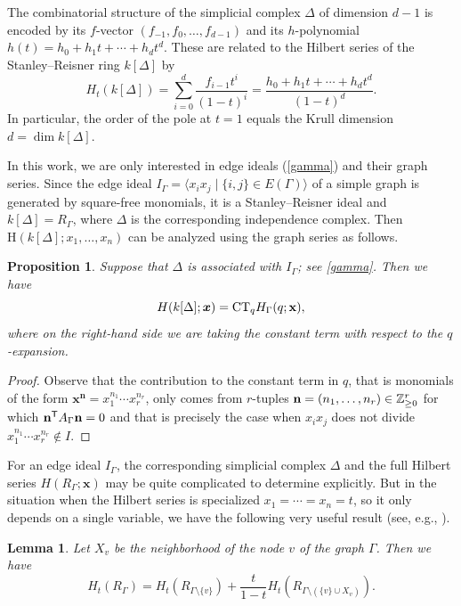 \documentclass[pdftex]{sigma}
\numberwithin{equation}{section}
\newtheorem{Lemma}[Theorem]{Lemma}
\newtheorem{Proposition}[Theorem]{Proposition}
\theoremstyle{definition}
\begin{document}
The combinatorial structure of the simplicial complex $\Delta$ of dimension
$d-1$ is encoded by its $f$-vector
$(f_{-1},f_0,\dots,f_{d-1})$ and its $h$-polynomial
$h(t)=h_0+h_1t+\cdots+h_dt^d$. These are related to the Hilbert
series of the Stanley--Reisner ring $k[\Delta]$ by
\[
H_t(k[\Delta])
=
\sum_{i=0}^{d}\frac{f_{i-1}t^i}{(1-t)^i}
=
\frac{h_0+h_1t+\cdots+h_dt^d}{(1-t)^d}.
\]
In particular, the order of the pole at $t=1$ equals the Krull dimension
$d=\dim k[\Delta]$.


In this work, we are only interested in edge ideals (\ref{gamma}) and their graph series. Since the edge ideal $I_\Gamma=\langle x_ix_j\mid \{i,j\}\in E(\Gamma)\rangle$ of a simple graph is generated by square-free monomials, it is a Stanley--Reisner ideal and $k[\Delta]=R_\Gamma$, where $\Delta$ is the corresponding independence complex. Then $\mathrm{H}(k[\Delta];x_1,\dots,x_n)$ can be
analyzed using the graph series as follows.

\begin{Proposition} Suppose that $\Delta$ is associated with $I_{\Gamma}$; see \eqref{gamma}. Then we have
\[
{H}(k[\Delta];\boldsymbol{x}) ={\rm CT}_q H_{\Gamma}(q; {\bf x}),
\]
where on the right-hand side we are taking the constant term with respect to the $q$-expansion.
\end{Proposition}
\begin{proof} Observe that the contribution to the constant term in $q$, that is monomials of the form $\boldsymbol{x}^{\boldsymbol{n}}=x_1^{n_1} \cdots x_r^{n_r}$, only comes from $r$-tuples ${\bf n}=(n_1,\dots,n_r) \in \mathbb{Z}_{\geq 0}^r $
for which ${\bf n}^{\mathsf{T}} A_{\Gamma} {\bf n}=0$ and that is precisely the case when $x_i x_j$ does not divide $x_1^{n_1} \cdots x_r^{n_r} \notin I$.
\end{proof}

For an edge ideal $I_\Gamma$, the corresponding simplicial complex $\Delta$ and the full Hilbert series $H(R_\Gamma;\boldsymbol{x})$ may be quite complicated to determine explicitly. But in the situation when the
Hilbert series is specialized $x_1=\cdots = x_n=t$, so it only depends on a single variable, we have the following very useful result (see, e.g., \cite{Edge}).

\begin{Lemma} \label{recursion} Let $X_{v}$ be the neighborhood of the node $v$ of the graph $\Gamma$.
Then we have
\[
H_t(R_\Gamma)=H_t(R_{\Gamma \setminus \{v\}})+\frac{t}{1-t}H_t(R_{\Gamma \setminus (\{v\}\cup X_v)}).
\]
\end{Lemma}
\end{document}
